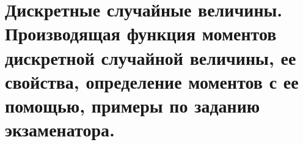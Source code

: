 \documentclass[polytech/stats/exam-2023/stats-exam-2023.tex]{subfiles}
\begin{document}
\section{Дискретные случайные величины. Производящая функция моментов дискретной случайной величины, ее свойства, определение моментов с ее помощью, примеры по заданию экзаменатора.}
\end{document}
